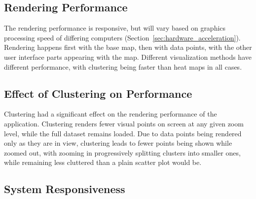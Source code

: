 
\subsection{Rendering Performance}

The rendering performance is responsive, but will vary based on graphics processing speed of differing computers (Section~\ref{sec:hardware_acceleration}). Rendering happens first with the base map, then with data points, with the other user interface parts appearing with the map. Different visualization methods have different performance, with clustering being faster than heat maps in all cases.

\subsection{Effect of Clustering on Performance}
\label{sec:effect_of_clustering_results}

Clustering had a significant effect on the rendering performance of the application. Clustering renders fewer visual points on screen at any given zoom level, while the full dataset remains loaded. Due to data points being rendered only as they are in view, clustering leads to fewer points being shown while zoomed out, with zooming in progressively splitting clusters into smaller ones, while remaining less cluttered than a plain scatter plot would be.

\subsection{System Responsiveness}

